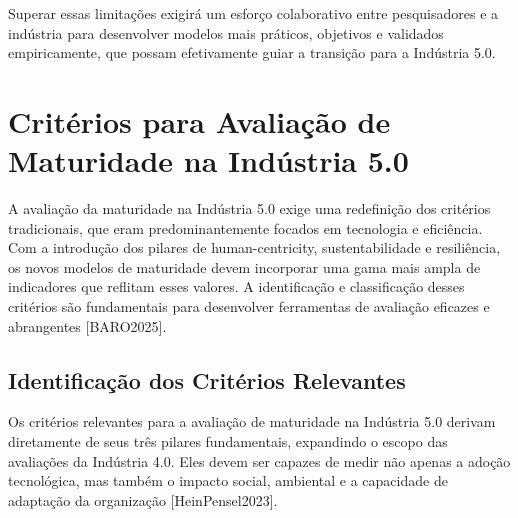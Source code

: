 Superar essas limitações exigirá um esforço colaborativo entre pesquisadores e a indústria para desenvolver modelos mais práticos, objetivos e validados empiricamente, que possam efetivamente guiar a transição para a Indústria 5.0.





\section{Critérios para Avaliação de Maturidade na Indústria 5.0}

A avaliação da maturidade na Indústria 5.0 exige uma redefinição dos critérios tradicionais, que eram predominantemente focados em tecnologia e eficiência. Com a introdução dos pilares de human-centricity, sustentabilidade e resiliência, os novos modelos de maturidade devem incorporar uma gama mais ampla de indicadores que reflitam esses valores. A identificação e classificação desses critérios são fundamentais para desenvolver ferramentas de avaliação eficazes e abrangentes [BARO2025].

\subsection{Identificação dos Critérios Relevantes}

Os critérios relevantes para a avaliação de maturidade na Indústria 5.0 derivam diretamente de seus três pilares fundamentais, expandindo o escopo das avaliações da Indústria 4.0. Eles devem ser capazes de medir não apenas a adoção tecnológica, mas também o impacto social, ambiental e a capacidade de adaptação da organização [HeinPensel2023].

